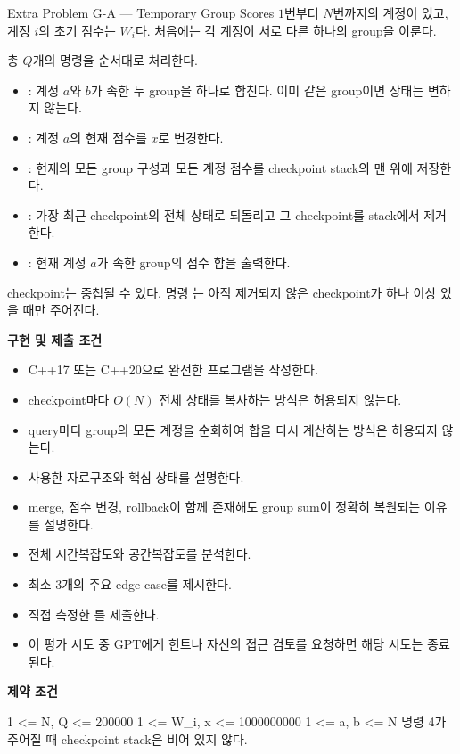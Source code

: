 \begin{problembox}{Extra Problem G-A --- Temporary Group Scores}
$1$번부터 $N$번까지의 계정이 있고, 계정 $i$의 초기 점수는 $W_i$다. 처음에는 각 계정이 서로 다른 하나의 group을 이룬다.

총 $Q$개의 명령을 순서대로 처리한다.
\begin{itemize}
\item {}: 계정 $a$와 $b$가 속한 두 group을 하나로 합친다. 이미 같은 group이면 상태는 변하지 않는다.
\item {}: 계정 $a$의 현재 점수를 $x$로 변경한다.
\item {}: 현재의 모든 group 구성과 모든 계정 점수를 checkpoint stack의 맨 위에 저장한다.
\item {}: 가장 최근 checkpoint의 전체 상태로 되돌리고 그 checkpoint를 stack에서 제거한다.
\item {}: 현재 계정 $a$가 속한 group의 점수 합을 출력한다.
\end{itemize}

checkpoint는 중첩될 수 있다. 명령 는 아직 제거되지 않은 checkpoint가 하나 이상 있을 때만 주어진다.

\textbf{구현 및 제출 조건}
\begin{itemize}
\item C++17 또는 C++20으로 완전한 프로그램을 작성한다.
\item checkpoint마다 $O(N)$ 전체 상태를 복사하는 방식은 허용되지 않는다.
\item query마다 group의 모든 계정을 순회하여 합을 다시 계산하는 방식은 허용되지 않는다.
\item 사용한 자료구조와 핵심 상태를 설명한다.
\item merge, 점수 변경, rollback이 함께 존재해도 group sum이 정확히 복원되는 이유를 설명한다.
\item 전체 시간복잡도와 공간복잡도를 분석한다.
\item 최소 3개의 주요 edge case를 제시한다.
\item 직접 측정한 를 제출한다.
\item 이 평가 시도 중 GPT에게 힌트나 자신의 접근 검토를 요청하면 해당 시도는 종료된다.
\end{itemize}

\textbf{제약 조건}
\begin{TextBlock}
1 <= N, Q <= 200000
1 <= W_i, x <= 1000000000
1 <= a, b <= N
명령 4가 주어질 때 checkpoint stack은 비어 있지 않다.
\end{TextBlock}


\end{problembox}
